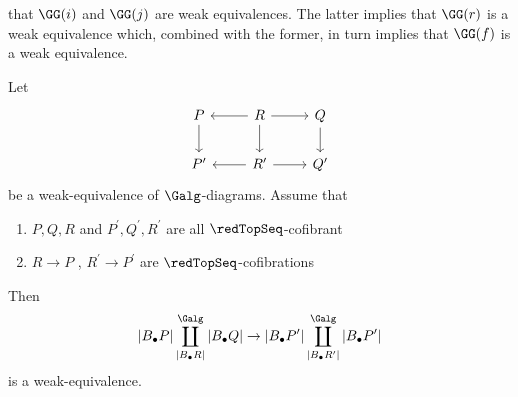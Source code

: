 \documentclass[a4paper,10pt]{amsart}
\begin{document}
that $\GG(i)$ and $\GG(j)$ are weak equivalences. The latter implies that $\GG(r)$ is a weak equivalence which, combined with the former, in turn implies that $\GG(f)$ is a  weak equivalence.\\

\begin{proposition}\label{compareproposition}
Let 
\begin{equation}\label{comparepropositiondig}
	\begin{tikzcd}
	P \ar{d} & R \ar{l}\ar{r}\ar{d} & Q \ar{d} \\
	P^{\prime}  & R^{\prime} \ar{l}\ar{r} & Q^{\prime} 
	\end{tikzcd}
\end{equation}
be a weak-equivalence of $\Galg$-diagrams.
Assume that 
	\begin{enumerate}
		\item $P,Q,R$ and $P^{\prime}, Q^{\prime} , R^{\prime}$ are all $\redTopSeq$-cofibrant
		\item $R \to P$ , $R^{\prime} \to P^{\prime}$ are $\redTopSeq$-cofibrations
	\end{enumerate}
	Then 
	\[ |B_\bullet P| \coprod^{\Galg}_{|B_\bullet R|} |B_\bullet Q| \to |B_\bullet P^{\prime}| \coprod^{\Galg}_{|B_\bullet R^{\prime}|}|B_\bullet P^{\prime}|\]
	is a weak-equivalence.
\end{proposition}
	
\end{document}

